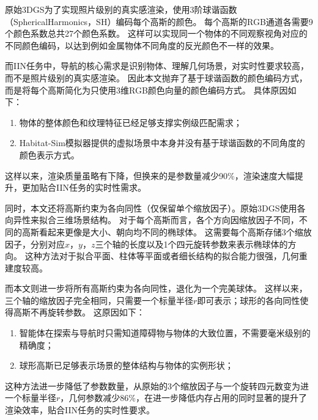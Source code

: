 原始3DGS为了实现照片级别的真实感渲染，使用3阶球谐函数（SphericalHarmonics，SH）编码每个高斯的颜色。
每个高斯的RGB通道各需要9个颜色系数总共27个颜色系数。
这样可以实现同一个物体的不同观察视角对应的不同颜色编码，以达到例如金属物体不同角度的反光颜色不一样的效果。

而IIN任务中，导航的核心需求是识别物体、理解几何场景，对实时性要求较高，而不是照片级别的真实感渲染。
因此本文抛弃了基于球谐函数的颜色编码方式，而是将每个高斯简化为只使用3维RGB颜色向量的颜色编码方式。
具体原因如下：
\begin{enumerate}
    \item 物体的整体颜色和纹理特征已经足够支撑实例级匹配需求；
    \item Habitat-Sim模拟器提供的虚拟场景中本身并没有基于球谐函数的不同角度的颜色表示方式。
\end{enumerate}
这样以来，渲染质量虽略有下降，但换来的是参数量减少90\%，渲染速度大幅提升，更加贴合IIN任务的实时性需求。

同时，本文还将高斯约束为各向同性（仅保留单个缩放因子）。原始3DGS使用各向异性来拟合三维场景结构。
对于每个高斯而言，各个方向因缩放因子不同，不同的高斯看起来更像是大小、朝向均不同的椭球体。
这需要每个高斯存储3个缩放因子，分别对应$x$，$y$，$z$三个轴的长度以及1个四元旋转参数来表示椭球体的方向。
这种方法对于拟合平面、柱体等平面或者细长结构的拟合能力很强，几何重建度较高。

而本文则进一步将所有高斯约束为各向同性，退化为一个完美球体。
这样以来，三个轴的缩放因子完全相同，只需要一个标量半径$r$即可表示；球形的各向同性使得高斯不再旋转参数。
这原因如下：
\begin{enumerate}
    \item 智能体在探索与导航时只需知道障碍物与物体的大致位置，不需要毫米级别的精确度；
    \item 球形高斯已足够表示场景的整体结构与物体的实例形状；
\end{enumerate}
这种方法进一步降低了参数数量，从原始的3个缩放因子与一个旋转四元数变为进一个标量半径$r$，几何参数减少86\%，在进一步降低内存占用的同时显著的提升了渲染效率，贴合IIN任务的实时性要求。

